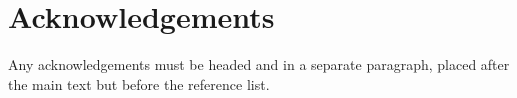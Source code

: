 \documentclass{article}
\begin{document}

\section*{Acknowledgements}

Any acknowledgements must be headed and in a separate paragraph,
placed after the main text but before the reference list.




%
%
%
%
\end{document}
